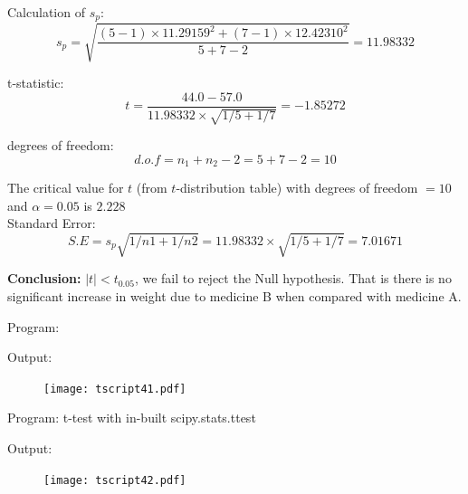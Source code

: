 \documentclass[a4paper,11pt,openright]{report}
\begin{document}
\begin{enumerate}
Calculation of $s_{p}$:
\begin{equation*}
s_{p} = \sqrt{\frac{(5-1) \times 11.29159^{2} + (7-1) \times 12.42310^{2}}{5+7-2}} 
      = 11.98332
\end{equation*}

t-statistic:
\begin{equation*}
t = \frac{44.0 - 57.0}{11.98332 \times \sqrt{1/5 + 1/7}} = -1.85272
\end{equation*}

degrees of freedom:
\begin{equation*}
d.o.f = n_{1} + n_{2} -2 = 5 + 7 - 2 = 10
\end{equation*}

The critical value for $t$ (from $t$-distribution table) with degrees of freedom $= 10$ and
$\alpha = 0.05$ is $2.228$ \\

Standard Error:
\begin{equation*}
S.E = s_{p} \sqrt{1/n1 + 1/n2} = 11.98332 \times \sqrt{1/5 + 1/7} = 7.01671
\end{equation*}

\textbf{Conclusion:} $|t| < t_{0.05}$, we fail to reject the Null hypothesis. That is there is
no significant increase in weight due to medicine B when compared with medicine A.

\pagebreak

Program:


\vspace{1cm}

Output:


\begin{figure}[ht!]
\texttt{[image: tscript41.pdf]}
\centering
\end{figure}

\pagebreak

Program: t-test with in-built scipy.stats.ttest


\vspace{0.5cm}

Output:


\begin{figure}[ht!]
\texttt{[image: tscript42.pdf]}
\centering
\end{figure}

\vspace{1cm}


\end{enumerate}
\end{document}
